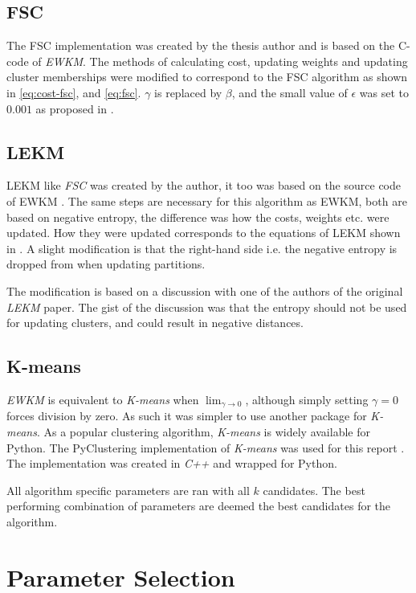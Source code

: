 \documentclass[../report.tex]{subfiles}
\begin{document}
\subsection{FSC}
The FSC implementation was created by the thesis author and is based on the C-code of \textit{EWKM}. The methods of calculating cost, updating weights and updating cluster memberships were modified to correspond to the FSC algorithm as shown in \cref{eq:cost-fsc}, and \cref{eq:fsc}. $\gamma$ is replaced by $\beta$, and the small value of $\epsilon$ was set to $0.001$ as proposed in \cite{Gan2006}.

\subsection{LEKM}
LEKM like \textit{FSC} was created by the author, it too was based on the source code of EWKM \cite{wskm2014hz}. The same steps are necessary for this algorithm as EWKM, both are based on negative entropy, the difference was how the costs, weights etc. were updated. How they were updated corresponds to the equations of LEKM shown in . A slight modification is that the right-hand side i.e. the negative entropy is dropped from when updating partitions.

The modification is based on a discussion with one of the authors of the original \textit{LEKM} paper. The gist of the discussion was that the entropy should not be used for updating clusters, and could result in negative distances.

\subsection{K-means}
\textit{EWKM} is equivalent to \textit{K-means} when $\lim_{\gamma \to 0}$, although simply setting $\gamma = 0$ forces division by zero. As such it was simpler to use another package for \textit{K-means}. As a popular clustering algorithm, \textit{K-means} is widely available for Python. The PyClustering implementation of \textit{K-means} was used for this report \cite{Novikov2019}. The implementation was created in \textit{C++} and wrapped for Python.

All algorithm specific parameters are ran with all $k$ candidates. The best performing combination of parameters are deemed the best candidates for the algorithm.
\section{Parameter Selection}
\end{document}
